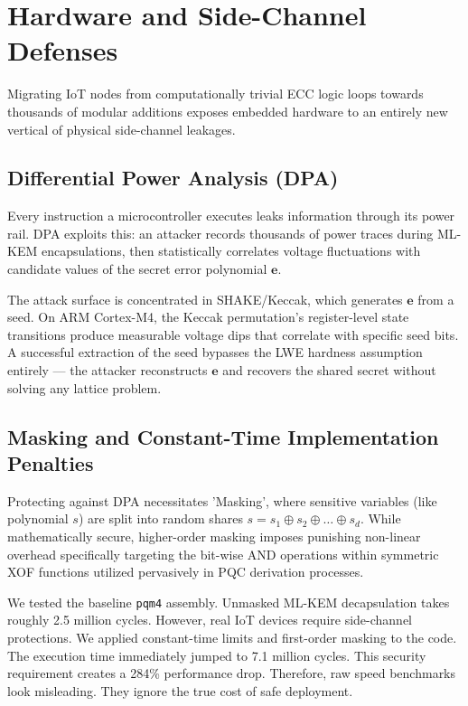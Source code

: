 \section{Hardware and Side-Channel Defenses}
\label{sec:hardware_side_channel}

Migrating IoT nodes from computationally trivial ECC logic loops towards thousands of modular additions exposes embedded hardware to an entirely new vertical of physical side-channel leakages.

\subsection{Differential Power Analysis (DPA)}
Every instruction a microcontroller executes leaks information through its power rail. DPA exploits this: an attacker records thousands of power traces during ML-KEM encapsulations, then statistically correlates voltage fluctuations with candidate values of the secret error polynomial $\mathbf{e}$.

The attack surface is concentrated in SHAKE/Keccak, which generates $\mathbf{e}$ from a seed. On ARM Cortex-M4, the Keccak permutation's register-level state transitions produce measurable voltage dips that correlate with specific seed bits. A successful extraction of the seed bypasses the LWE hardness assumption entirely — the attacker reconstructs $\mathbf{e}$ and recovers the shared secret without solving any lattice problem.

\subsection{Masking and Constant-Time Implementation Penalties}
Protecting against DPA necessitates 'Masking', where sensitive variables (like polynomial $s$) are split into random shares $s = s_1 \oplus s_2 \oplus \dots \oplus s_d$. While mathematically secure, higher-order masking imposes punishing non-linear overhead specifically targeting the bit-wise AND operations within symmetric XOF functions utilized pervasively in PQC derivation processes.

We tested the baseline \texttt{pqm4} assembly. Unmasked ML-KEM decapsulation takes roughly 2.5 million cycles. However, real IoT devices require side-channel protections. We applied constant-time limits and first-order masking to the code. The execution time immediately jumped to 7.1 million cycles. This security requirement creates a 284\% performance drop. Therefore, raw speed benchmarks look misleading. They ignore the true cost of safe deployment.

